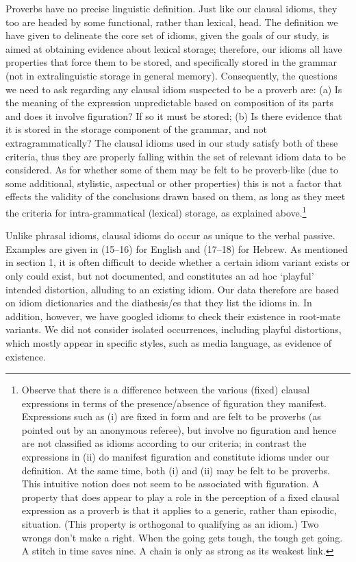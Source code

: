 \documentclass[output=paper,
modfonts
]{LSP/langsci}
\begin{document}
Proverbs have no precise linguistic definition. Just like our clausal
idioms, they too are headed by some functional, rather than lexical,
head. The definition we have given to delineate the core set of idioms,
given the goals of our study, is aimed at obtaining evidence about
lexical storage; therefore, our idioms all have properties that force
them to be stored, and specifically stored in the grammar (not in
extralinguistic storage in general memory). Consequently, the questions
we need to ask regarding any clausal idiom suspected to be a proverb
are: (a) Is the meaning of the expression unpredictable based on
composition of its parts and does it involve figuration? If so it must
be stored; (b) Is there evidence that it is stored in the storage
component of the grammar, and not extragrammatically? The clausal idioms
used in our study satisfy both of these criteria, thus they are properly
falling within the set of relevant idiom data to be considered. As for
whether some of them may be felt to be proverb-like (due to some
additional, stylistic, aspectual or other properties) this is not a
factor that effects the validity of the conclusions drawn based on them,
as long as they meet the criteria for intra-grammatical (lexical)
storage, as explained above.\footnote{Observe that there is a difference
  between the various (fixed) clausal expressions in terms of the
  presence/absence of figuration they manifest. Expressions such as (i)
  are fixed in form and are felt to be proverbs (as pointed out by an
  anonymous referee), but involve no figuration and hence are not
  classified as idioms according to our criteria; in contrast the
  expressions in (ii) do manifest figuration and constitute idioms under
  our definition. At the same time, both (i) and (ii) may be felt to be
  proverbs. This intuitive notion does not seem to be associated with
  figuration. A property that does appear to play a role in the
  perception of a fixed clausal expression as a proverb is that it
  applies to a generic, rather than episodic, situation. (This property
  is orthogonal to qualifying as an idiom.)
  \ea
  	\ea Two wrongs don't make a right.
	\ex When the going gets tough, the tough get going.
	\z
\ex
	\ea A stitch in time saves nine.
	\ex A chain is only as strong as its weakest link.
	\z
\z
  }

Unlike phrasal idioms, clausal idioms do occur as unique to the verbal
passive. Examples are given in (15--16) for English and (17--18) for
Hebrew. As mentioned in section 1, it is often difficult to decide
whether a certain idiom variant exists or only could exist, but not
documented, and constitutes an ad hoc `playful' intended distortion,
alluding to an existing idiom. Our data therefore are based on idiom
dictionaries and the diathesis/es that they list the idioms in. In
addition, however, we have googled idioms to check their existence in
root-mate variants. We did not consider isolated occurrences, including
playful distortions, which mostly appear in specific styles, such as
media language, as evidence of existence.
\end{document}
